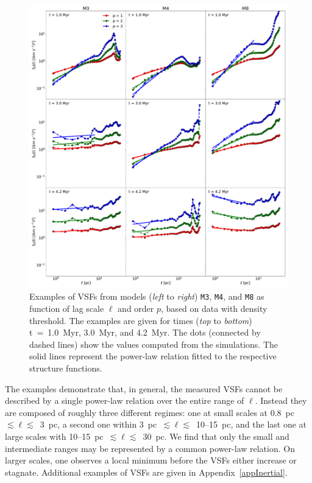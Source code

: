 \documentclass{aa}		%
\begin{document}
\begin{figure}[!htb]
	\centering
    \includegraphics[width=\textwidth]{app_examples_wthres_s_l.pdf}
    \caption{
        Examples of VSFs from models (\textit{left} to \textit{right}) \texttt{M3}, \texttt{M4}, and \texttt{M8} as function of lag scale $\ell$ and order $p$, based on data with density threshold. 
        The examples are given for times (\textit{top} to \textit{bottom}) t~=~1.0~Myr, 3.0~Myr, and 4.2~Myr.
        The dots (connected by dashed lines) show the values computed from the simulations. 
        The solid lines represent the power-law relation fitted to the respective structure functions.
    }
	\label{pic:results:vsf_example}
\end{figure}

The examples demonstrate that, in general, the measured VSFs cannot be described by a single power-law relation over the entire range of $\ell$.
Instead they are composed of roughly three different regimes: 
one at small scales at 0.8~pc~$\lesssim \ell \lesssim$~3~pc, a second one within 3~pc~$\lesssim \ell \lesssim$~10--15~pc, and the last one at large scales with 10--15~pc~$\lesssim \ell \lesssim$~30~pc.
We find that only the small and intermediate ranges may be represented by a common power-law relation.
On larger scales, one observes a local minimum before the VSFs either increase or stagnate.
Additional examples of VSFs are given in Appendix~\ref{appInertial}.
\end{document}
